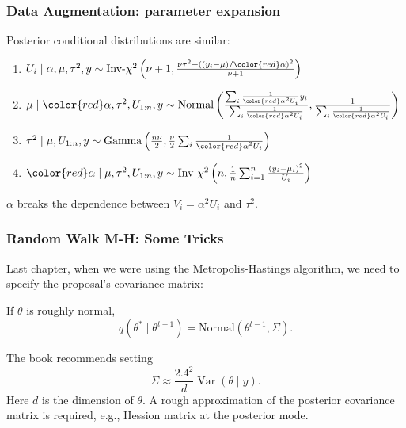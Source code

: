 \documentclass{beamer}
\begin{document}
\begin{frame}
\frametitle{Data Augmentation: parameter expansion}

Posterior conditional distributions are similar:
\begin{enumerate}
\item $U_i \mid \alpha, \mu, \tau^2, y \sim \text{Inv-}\chi^2\left(\nu
    + 1, \frac{ \nu \tau^2 + ((y_i - \mu)/{\color{red} \alpha})^2 }{\nu+1 } \right)$
\item $\mu \mid {\color{red} \alpha}, \tau^2, U_{1:n}, y \sim \text{Normal}\left(\frac{\sum_i \frac{1}{{\color{red} \alpha}^2U_i}y_i }{\sum_i \frac{1}{{\color{red} \alpha}^2U_i} }, \frac{1}{ \sum_i \frac{1}{{\color{red} \alpha}^2U_i} }\right)$ 
\item $\tau^2 \mid \mu, U_{1:n}, y \sim \text{Gamma}\left(\frac{n
      \nu}{2}, \frac{\nu}{2}\sum_i \frac{1}{{\color{red} \alpha}^2U_i} \right)$
\item ${\color{red} \alpha} \mid \mu, \tau^2, U_{1:n}, y \sim \mbox{Inv-}\chi^2\left(n,
  \frac{1}{n}\sum_{i=1}^n \frac{(y_i - \mu_i)^2}{U_i}\right)$ 
\end{enumerate}

$\alpha$ breaks the dependence between $V_i = \alpha^2 U_i$ and $\tau^2$.
\end{frame}


\begin{frame}
\frametitle{Random Walk M-H: Some Tricks}

Last chapter, when we were using the Metropolis-Hastings algorithm, we
need to specify the proposal's covariance matrix:

If $\theta$ is roughly normal,
$$
q(\theta^* \mid \theta^{t-1}) = \text{Normal}(\theta^{t-1}, \Sigma).
$$

The book recommends setting 
$$
\Sigma \approx \frac{2.4^2}{d} \operatorname{Var}(\theta \mid y).
$$
Here $d$ is the dimension of $\theta$. A rough approximation of the
posterior covariance matrix is required, e.g., Hession matrix at the
posterior mode.
\end{frame}
\end{document}
